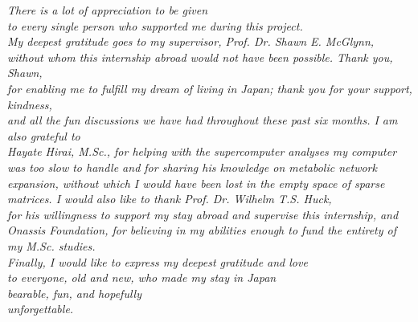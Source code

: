 \newpage
\begin{center}
    \begin{flushright}
    \thispagestyle{empty}
    \vspace*{\fill}
    \normalsize\emph{There is a lot of appreciation to be given\\to every single person who supported me during this project.\\My deepest gratitude goes to my supervisor, Prof. Dr. Shawn E. McGlynn,\\without whom this internship abroad would not have been possible. Thank you, Shawn,\\for enabling me to fulfill my dream of living in Japan; thank you for your support, kindness,\\and all the fun discussions we have had throughout these past six months. I am also grateful to\\Hayate Hirai, M.Sc., for helping with the supercomputer analyses my computer was too slow to handle and for sharing his knowledge on metabolic network expansion, without which I would have been lost in the empty space of sparse matrices. I would also like to thank Prof. Dr. Wilhelm T.S. Huck,\\for his willingness to support my stay abroad and supervise this internship, and Onassis Foundation, for believing in my abilities enough to fund the entirety of my M.Sc. studies.\\Finally, I would like to express my deepest gratitude and love\\to everyone, old and new, who made my stay in Japan\\bearable, fun, and hopefully\\unforgettable.}
    \vspace*{\fill}
    \end{flushright}
\end{center}
